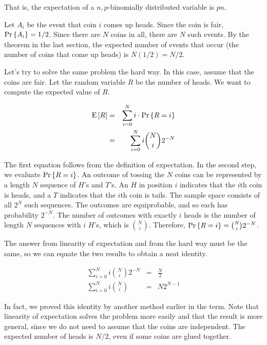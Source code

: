 \documentclass[11pt,twoside]{article}
\begin{document}
That is, the expectation of a $n,p$-binomially distributed variable is
$pn$.

\iffalse

Let $A_i$ be the event that coin $i$ comes up heads.
Since the coin is fair, $\mathop{\textup{Pr}}\nolimits\left\{A_i\right\} = 1/2$.  Since
there are $N$ coins in all, there are $N$ such events.  By the theorem
in the last section, the expected number of events that occur (the
number of coins that come up heads) is $N(1/2) =
N/2$.

Let's try to solve the same problem the hard way.  In this case,
assume that the coins are fair.  Let the random variable $R$ be the
number of heads.  We want to compute the expected value of $R$.

\begin{eqnarray*}
\mathop{\textup{E}}\nolimits\left[R\right]  & = & \sum_{i=0}^N i \cdot \mathop{\textup{Pr}}\nolimits\left\{R = i\right\} \\
        & = & \sum_{i=0}^N i \binom{N}{i} 2^{-N}
\end{eqnarray*}

The first equation follows from the definition of expectation.  In the
second step, we evaluate $\mathop{\textup{Pr}}\nolimits\left\{R = i\right\}$.  An outcome of tossing the $N$
coins can be represented by a length $N$ sequence of $H$'s and $T$'s.
An $H$ in position $i$ indicates that the $i$th coin is heads, and a
$T$ indicates that the $i$th coin is tails.  The sample space
consists of all $2^N$ such sequences.  The outcomes are equiprobable,
and so each has probability $2^{-N}$.  The number of outcomes with
exactly $i$ heads is the number of length $N$ sequences with $i$
$H$'s, which is $\binom{N}{i}$.  Therefore, $\mathop{\textup{Pr}}\nolimits\left\{R = i\right\} = \binom{N}{i}
2^{-N}$.

The answer from linearity of expectation and from the hard way must be
the same, so we can equate the two results to obtain a neat identity.

\begin{eqnarray*}
\sum_{i=0}^N i \binom{N}{i} 2^{-N} & = & \frac{N}{2} \\
\sum_{i=0}^N i \binom{N}{i} & = & N2^{N-1}
\end{eqnarray*}

In fact, we proved this identity by another method earlier in the
term.  Note that linearity of expectation solves the problem more
easily and that the result is more general, since we do not need to
assume that the coins are independent.  The expected number of
heads is $N/2$, even if some coins are glued together.
\end{document}

